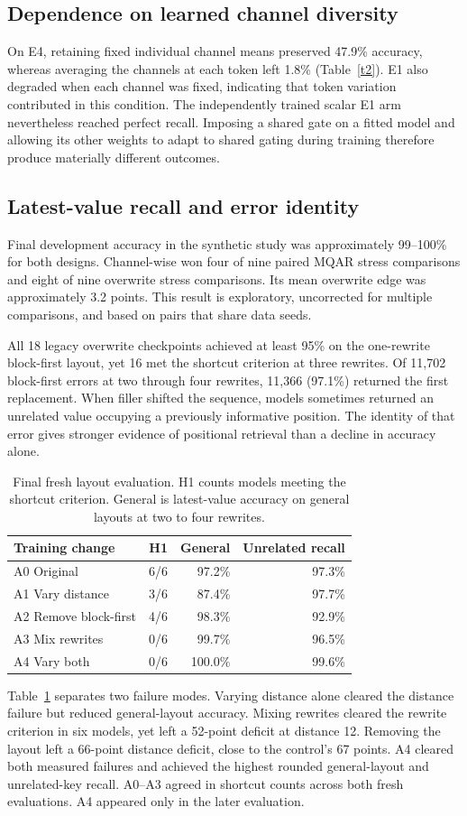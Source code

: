 \documentclass[conference]{IEEEtran}
\begin{document}
\subsection{Dependence on learned channel diversity}
On E4, retaining fixed individual channel means preserved 47.9\% accuracy, whereas averaging the channels at each token left 1.8\% (Table~\ref{t2}). E1 also degraded when each channel was fixed, indicating that token variation contributed in this condition. The independently trained scalar E1 arm nevertheless reached perfect recall. Imposing a shared gate on a fitted model and allowing its other weights to adapt to shared gating during training therefore produce materially different outcomes.
\subsection{Latest-value recall and error identity}
Final development accuracy in the synthetic study was approximately 99--100\% for both designs. Channel-wise won four of nine paired MQAR stress comparisons and eight of nine overwrite stress comparisons. Its mean overwrite edge was approximately 3.2 points. This result is exploratory, uncorrected for multiple comparisons, and based on pairs that share data seeds.

All 18 legacy overwrite checkpoints achieved at least 95\% on the one-rewrite block-first layout, yet 16 met the shortcut criterion at three rewrites. Of 11,702 block-first errors at two through four rewrites, 11,366 (97.1\%) returned the first replacement. When filler shifted the sequence, models sometimes returned an unrelated value occupying a previously informative position. The identity of that error gives stronger evidence of positional retrieval than a decline in accuracy alone.
\begin{table}[t]\centering\caption{Final fresh layout evaluation. H1 counts models meeting the shortcut criterion. General is latest-value accuracy on general layouts at two to four rewrites.}\label{t3}
\begin{tabular}{lrrr}\toprule Training change&H1&General&Unrelated recall\\\midrule
A0 Original&6/6&97.2\%&97.3\%\\
A1 Vary distance&3/6&87.4\%&97.7\%\\
A2 Remove block-first&4/6&98.3\%&92.9\%\\
A3 Mix rewrites&0/6&99.7\%&96.5\%\\
A4 Vary both&0/6&100.0\%&99.6\%\\\bottomrule\end{tabular}\end{table}
Table~\ref{t3} separates two failure modes. Varying distance alone cleared the distance failure but reduced general-layout accuracy. Mixing rewrites cleared the rewrite criterion in six models, yet left a 52-point deficit at distance 12. Removing the layout left a 66-point distance deficit, close to the control's 67 points. A4 cleared both measured failures and achieved the highest rounded general-layout and unrelated-key recall. A0--A3 agreed in shortcut counts across both fresh evaluations. A4 appeared only in the later evaluation.
\end{document}
